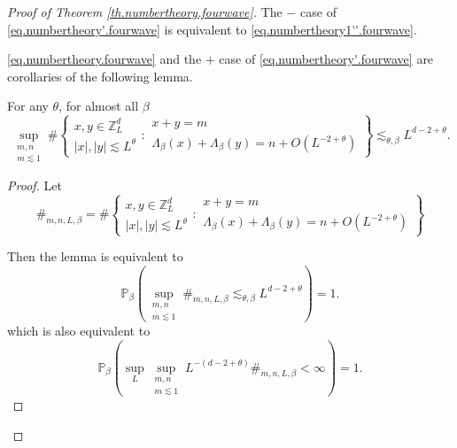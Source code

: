 \begin{proof}[Proof of Theorem \ref{th.numbertheory.fourwave}]
The $-$ case of \eqref{eq.numbertheory'.fourwave} is equivalent to \eqref{eq.numbertheory1''.fourwave}.

\eqref{eq.numbertheory.fourwave} and the $+$ case of \eqref{eq.numbertheory'.fourwave} are corollaries of the following lemma. 

\begin{lem}\label{lem.irrationallemma.fourwave} For any $\theta$, for almost all $\beta$
\begin{equation}
    \sup_{\substack{m,n\\m\lesssim 1}} \#\left\{\begin{array}{cc}
         x,y\in\mathbb{Z}^d_L  \\
         |x|,|y|\lesssim L^{\theta}
    \end{array}:\begin{array}{cc}
         x+y=m  \\
         \Lambda_{\beta}(x)+\Lambda_{\beta}(y)=n+O(L^{-2+\theta})
    \end{array}\right\}\lesssim_{\theta,\beta} L^{d-2+\theta} .
\end{equation}
\end{lem}
\begin{proof} Let 
\begin{equation}
    \#_{m,n,L,\beta}=\#\left\{\begin{array}{cc}
         x,y\in\mathbb{Z}^d_L  \\
         |x|,|y|\lesssim L^{\theta}
    \end{array}:\begin{array}{cc}
         x+y=m  \\
         \Lambda_{\beta}(x)+\Lambda_{\beta}(y)=n+O(L^{-2+\theta})
    \end{array}\right\}
\end{equation}


Then the lemma is equivalent to 
\begin{equation}
    \mathbb{P}_{\beta}\left(\sup_{\substack{m,n\\m\lesssim 1}} \#_{m,n,L,\beta} \lesssim_{\theta,\beta} L^{d-2+\theta}\right)=1.
\end{equation}
which is also equivalent to
\begin{equation}\label{eq.irrationallemmaexpand.fourwave}
    \mathbb{P}_{\beta}\left(\sup_{L}\sup_{\substack{m,n\\m\lesssim 1}} L^{-(d-2+\theta)}\#_{m,n,L,\beta} <\infty \right)=1.
\end{equation}


\end{proof}
\end{proof}
